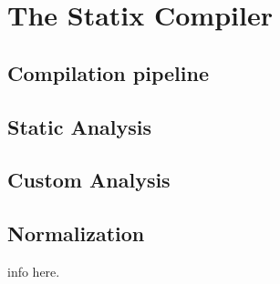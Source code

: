 
\chapter{\label{chap:statix-compiler}The Statix Compiler}

\section{Compilation pipeline}

\section{Static Analysis}

\section{Custom Analysis}

\section{Normalization}

info here.